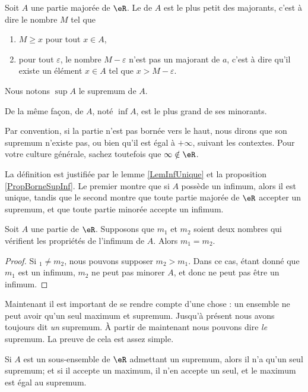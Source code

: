 \begin{definition}		\label{DefSupeA}
Soit $A$ une partie majorée de $\eR$. Le  de $A$ est le plus petit des majorants, c'est à dire le nombre $M$ tel que
\begin{enumerate}
	\item
		$M\geq x$ pour tout $x\in A$,
	\item
		pour tout $\varepsilon$, le nombre $M-\varepsilon$ n'est pas un majorant de $a$, c'est à dire qu'il existe un élément $x\in A$ tel que $x>M-\varepsilon$.
\end{enumerate}
Nous notons $\sup A$ le supremum de $A$.

De la même façon,  de $A$, noté $\inf A$, est le plus grand de ses minorants. 
\end{definition}
Par convention, si la partie n'est pas bornée vers le haut, nous dirons que son supremum n'existe pas, ou bien qu'il est égal à $+\infty$, suivant les contextes. Pour votre culture générale, sachez toutefois que $\infty\notin\eR$.

La définition est justifiée par le lemme \ref{LemInfUnique} et la proposition \ref{PropBorneSupInf}. Le premier montre que si $A$ possède un infimum, alors il est unique, tandis que le second montre que toute partie majorée de $\eR$ accepter un supremum, et que toute partie minorée accepte un infimum.
\begin{lemma}		\label{LemInfUnique}
	Soit $A$ une partie de $\eR$. Supposons que $m_1$ et $m_2$ soient deux nombres qui vérifient les propriétés de l'infimum de $A$. Alors $m_1=m_2$.
\end{lemma}

\begin{proof}
	Si $_1\neq m_2$, nous pouvons supposer $m_2>m_1$. Dans ce cas, étant donné que $m_1$ est un infimum, $m_2$ ne peut pas minorer $A$, et donc ne peut pas être un infimum.
\end{proof}

Maintenant il est important de se rendre compte d'une chose : un ensemble ne peut avoir qu'un seul maximum et supremum. Jusqu'à présent nous avons toujours dit \emph{un} supremum. À partir de maintenant nous pouvons dire \emph{le} supremum. La preuve de cela est assez simple.
\begin{proposition}
Si $A$ est un sous-ensemble de $\eR$ admettant un supremum, alors il n'a qu'un seul supremum; et si il accepte un maximum, il n'en accepte un seul, et le maximum est égal au supremum.
\end{proposition}


